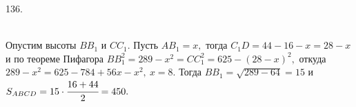 136. \begin{figure}[ht!]
\end{figure}\\
Опустим высоты $BB_1$ и $CC_1.$ Пусть $AB_1=x,$ тогда $C_1D=44-16-x=28-x$ и по теореме Пифагора $BB_1^2=289-x^2=CC_1^2=625-(28-x)^2,$ откуда
$289-x^2=625-784+56x-x^2,\ x=8.$ Тогда $BB_1=\sqrt{289-64}=15$ и $S_{ABCD}=15\cdot\cfrac{16+44}{2}=450.$\\
